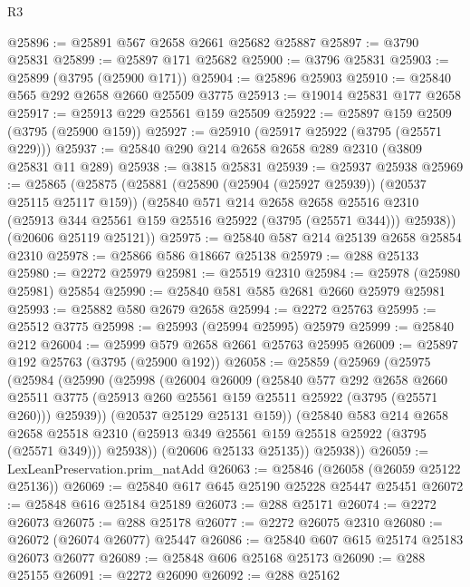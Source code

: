 \begin{lexlean}{R3}
\begin{coremodule}
@25896 := @25891 @567 @2658 @2661 @25682 @25887
@25897 := @3790 @25831
@25899 := @25897 @171 @25682
@25900 := @3796 @25831
@25903 := @25899 (@3795 (@25900 @171))
@25904 := @25896 @25903
@25910 := @25840 @565 @292 @2658 @2660 @25509 @3775
@25913 := @19014 @25831 @177 @2658
@25917 := @25913 @229 @25561 @159 @25509
@25922 := @25897 @159 @2509 (@3795 (@25900 @159))
@25927 := @25910 (@25917 @25922 (@3795 (@25571 @229)))
@25937 := @25840 @290 @214 @2658 @2658 @289 @2310 (@3809 @25831 @11 @289)
@25938 := @3815 @25831
@25939 := @25937 @25938
@25969 := @25865
    (@25875
      (@25881
        (@25890 (@25904 (@25927 @25939)) (@20537 @25115 @25117 @159))
        (@25840
          @571
          @214
          @2658
          @2658
          @25516
          @2310
          (@25913 @344 @25561 @159 @25516 @25922 (@3795 (@25571 @344)))
          @25938))
      (@20606 @25119 @25121))
@25975 := @25840 @587 @214 @25139 @2658 @25854 @2310
@25978 := @25866 @586 @18667 @25138
@25979 := @288 @25133
@25980 := @2272 @25979
@25981 := @25519 @2310
@25984 := @25978 (@25980 @25981) @25854
@25990 := @25840 @581 @585 @2681 @2660 @25979 @25981
@25993 := @25882 @580 @2679 @2658
@25994 := @2272 @25763
@25995 := @25512 @3775
@25998 := @25993 (@25994 @25995) @25979
@25999 := @25840 @212
@26004 := @25999 @579 @2658 @2661 @25763 @25995
@26009 := @25897 @192 @25763 (@3795 (@25900 @192))
@26058 := @25859
    (@25969
      (@25975
        (@25984
          (@25990
            (@25998
              (@26004
                @26009
                (@25840
                  @577
                  @292
                  @2658
                  @2660
                  @25511
                  @3775
                  (@25913 @260 @25561 @159 @25511 @25922 (@3795 (@25571 @260)))
                  @25939))
              (@20537 @25129 @25131 @159))
            (@25840
              @583
              @214
              @2658
              @2658
              @25518
              @2310
              (@25913 @349 @25561 @159 @25518 @25922 (@3795 (@25571 @349)))
              @25938))
          (@20606 @25133 @25135))
        @25938))
@26059 := LexLeanPreservation.prim_natAdd
@26063 := @25846 (@26058 (@26059 @25122 @25136))
@26069 := @25840 @617 @645 @25190 @25228 @25447 @25451
@26072 := @25848 @616 @25184 @25189
@26073 := @288 @25171
@26074 := @2272 @26073
@26075 := @288 @25178
@26077 := @2272 @26075 @2310
@26080 := @26072 (@26074 @26077) @25447
@26086 := @25840 @607 @615 @25174 @25183 @26073 @26077
@26089 := @25848 @606 @25168 @25173
@26090 := @288 @25155
@26091 := @2272 @26090
@26092 := @288 @25162

\end{coremodule}
\end{lexlean}
